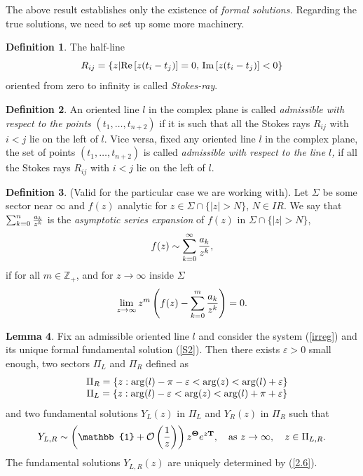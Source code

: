 \documentclass[12pt]{article}
\def\IM{\hbox{\rm{Im}}\,}
\def\RE{\hbox{\rm{Re}}\,}
\def\eps{\varepsilon}
\def\arg{{\rm arg}}
\newcommand{\ID}{\mathbb{1}}
\newcommand {\interi}{\mathbb Z}
\newcommand{\reali}{I\!\!R}
\theoremstyle{definition}
\newtheorem{df}{Definition}
\theoremstyle{theorem}
\newtheorem{lm}[df]{Lemma}
\begin{document}
The above result establishes only the existence of {\it formal
solutions.}\/ Regarding the true solutions, we need to set up 
some more machinery.


\begin{df}
The half-line  
\begin{equation}
R_{ij}=\{z| \RE[z(t_i-t_j)]=0,\,\IM[z(t_i-t_j)]<0\}
\end{equation}
oriented from zero to infinity is called {\it Stokes-ray}.
\label{S3.5}
\end{df}

\begin{df}
An oriented line $l$ in the complex plane is called {\it admissible
 with respect to the points}\/ $(t_1,\dots,t_{n+2})$ if it is such that 
all the Stokes rays $R_{ij}$ with $i<j$ lie on the left of $l$. Vice versa, 
fixed any oriented line $l$ in the complex plane, 
the set of points $(t_1,\dots,t_{n+2})$ is called {\it admissible with
respect to the line $l$,}\/ if all the 
Stokes rays $R_{ij}$ with $i<j$ lie on the left of $l$.
\label{SS3.5}
\end{df}

\begin{df}
(Valid for the particular case we are working with). Let
$\Sigma$ be some sector near $\infty$ and $f(z)$ analytic for $z\in
\Sigma\cap\{|z|>N\}$, $N\in\reali$.
We say that $\sum_{k=0}^n {a_k\over z^k}$ is the {\it asymptotic series
expansion}\/ of $f(z)$ in $\Sigma\cap\{|z|>N\}$,
$$
f(z)\sim\sum_{k=0}^\infty {a_k\over z^k},
$$
if for all $m\in\interi_+$, and for $z\to\infty$ inside $\Sigma$
$$
\lim_{z\to\infty}z^m\left(f(z)-\sum_{k=0}^m {a_k\over z^k}\right)=0.
$$
\label{def5}\end{df}

\begin{lm} Fix an admissible oriented line $l$ and consider the system 
(\ref{irreg}) and its unique formal fundamental solution (\ref{S2}). 
Then there exists $\eps>0$ 
small enough, two sectors $\Pi_L$ and $\Pi_R$ defined as
\begin{equation}
\begin{array}{cc}
&\Pi_R=\{z: \arg(l)-\pi-\eps<\arg(z)<\arg(l)+\eps\}\\
&\Pi_L=\{z: \arg(l)-\eps<\arg(z)<\arg(l)+\pi+\eps\}\\
\end{array}
\end{equation}
and two fundamental solutions $Y_L(z)$ in $\Pi_L$ and
$Y_R(z)$ in $\Pi_R$ such that
\begin{equation}
Y_{L,R}\sim\left(\ID+{\cal O}\left({1\over z}\right)\right)
z^{\bf\Theta} e^{z {\bf T}},\quad\hbox{as }z\to\infty,\quad z\in \Pi_{L,R}.
\label{2.6}
\end{equation}
The fundamental solutions $Y_{L,R}(z)$ are uniquely determined by 
(\ref{2.6}). 
\label{S4}\end{lm}
\end{document}
